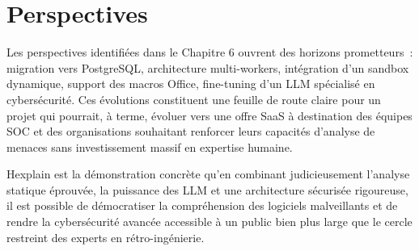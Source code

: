 \section*{Perspectives}

Les perspectives identifiées dans le Chapitre 6 ouvrent des horizons prometteurs~: migration vers PostgreSQL, architecture multi-workers, intégration d'un sandbox dynamique, support des macros Office, fine-tuning d'un LLM spécialisé en cybersécurité. Ces évolutions constituent une feuille de route claire pour un projet qui pourrait, à terme, évoluer vers une offre SaaS à destination des équipes SOC et des organisations souhaitant renforcer leurs capacités d'analyse de menaces sans investissement massif en expertise humaine.

\vspace{1cm}

\noindent Hexplain est la démonstration concrète qu'en combinant judicieusement l'analyse statique éprouvée, la puissance des LLM et une architecture sécurisée rigoureuse, il est possible de démocratiser la compréhension des logiciels malveillants et de rendre la cybersécurité avancée accessible à un public bien plus large que le cercle restreint des experts en rétro-ingénierie.
